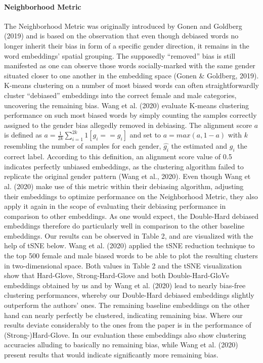 \documentclass[
  english,
  man,floatsintext]{apa6}
\let\oldparagraph\paragraph
\renewcommand{\paragraph}[1]{\oldparagraph{#1}\mbox{}}
\begin{document}
\hypertarget{neighborhood-metric}{%
\paragraph{Neighborhood Metric}\label{neighborhood-metric}}

The Neighborhood Metric was originally introduced by Gonen and Goldberg (2019) and is based on the observation that even though debiased words no longer inherit their bias in form of a specific gender direction, it remains in the word embeddings' spatial grouping. The supposedly ``removed'' bias is still manifested as one can observe those words socially-marked with the same gender situated closer to one another in the embedding space (Gonen \& Goldberg, 2019).
K-means clustering on a number of most biased words can often straightforwardly cluster ``debiased'' embeddings into the correct female and male categories, uncovering the remaining bias.
Wang et al. (2020) evaluate K-means clustering performance on such most biased words by simply counting the samples correctly assigned to the gender bias allegedly removed in debiasing. The alignment score \(a\) is defined as \(a = \frac{1}{2k}\sum_{i=1}^{2k}1[\hat{g_{i}}== g_{i}]\) and set to \(a = max(a, 1-a)\) with \(k\) resembling the number of samples for each gender, \(\hat{g_{i}}\) the estimated and \(g_{i}\) the correct label. According to this definition, an alignment score value of 0.5 indicates perfectly unbiased embeddings, as the clustering algorithm failed to replicate the original gender pattern (Wang et al., 2020).
Even though Wang et al. (2020) make use of this metric within their debiasing algorithm, adjusting their embeddings to optimize performance on the Neighborhood Metric, they also apply it again in the scope of evaluating their debiasing performance in comparison to other embeddings. As one would expect, the Double-Hard debiased embeddings therefore do particularly well in comparison to the other baseline embeddings.
Our results can be observed in Table 2, and are visualized with the help of tSNE below. Wang et al. (2020) applied the tSNE reduction technique to the top 500 female and male biased words to be able to plot the resulting clusters in two-dimensional space. Both values in Table 2 and the tSNE visualization show that Hard-Glove, Strong-Hard-Glove and both Double-Hard-GloVe embeddings obtained by us and by Wang et al. (2020) lead to nearly bias-free clustering performances, whereby our Double-Hard debiased embeddings slightly outperform the authors' ones. The remaining baseline embeddings on the other hand can nearly perfectly be clustered, indicating remaining bias.
Where our results deviate considerably to the ones from the paper is in the performance of (Strong-)Hard-Glove. In our evaluation these embeddings also show clustering accuracies alluding to basically no remaining bias, while Wang et al. (2020) present results that would indicate significantly more remaining bias.
\end{document}

